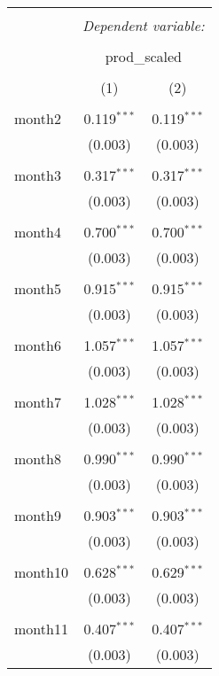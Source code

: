 \documentclass[12pt]{article}
\begin{document}
\begin{table}[!htbp] \centering
  \caption{}
  \label{}
\begin{tabular}{@{\extracolsep{5pt}}lcc}
\\[-1.8ex]\hline
\hline \\[-1.8ex]
 & \multicolumn{2}{c}{\textit{Dependent variable:}} \\
\cline{2-3}
\\[-1.8ex] & \multicolumn{2}{c}{prod\_scaled} \\
\\[-1.8ex] & (1) & (2)\\
\hline \\[-1.8ex]
 month2 & 0.119$^{***}$ & 0.119$^{***}$ \\
  & (0.003) & (0.003) \\
  & & \\
 month3 & 0.317$^{***}$ & 0.317$^{***}$ \\
  & (0.003) & (0.003) \\
  & & \\
 month4 & 0.700$^{***}$ & 0.700$^{***}$ \\
  & (0.003) & (0.003) \\
  & & \\
 month5 & 0.915$^{***}$ & 0.915$^{***}$ \\
  & (0.003) & (0.003) \\
  & & \\
 month6 & 1.057$^{***}$ & 1.057$^{***}$ \\
  & (0.003) & (0.003) \\
  & & \\
 month7 & 1.028$^{***}$ & 1.028$^{***}$ \\
  & (0.003) & (0.003) \\
  & & \\
 month8 & 0.990$^{***}$ & 0.990$^{***}$ \\
  & (0.003) & (0.003) \\
  & & \\
 month9 & 0.903$^{***}$ & 0.903$^{***}$ \\
  & (0.003) & (0.003) \\
  & & \\
 month10 & 0.628$^{***}$ & 0.629$^{***}$ \\
  & (0.003) & (0.003) \\
  & & \\
 month11 & 0.407$^{***}$ & 0.407$^{***}$ \\
  & (0.003) & (0.003) \\

\end{tabular}
\end{table}
\end{document}
